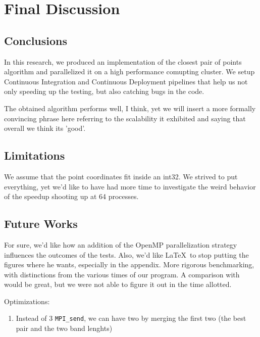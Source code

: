 \section{Final Discussion}
\label{sec:final_discussion}

\subsection{Conclusions}
In this research, we produced an implementation of the closest pair of points algorithm and parallelized it on a high performance comupting cluster.
We setup Continuous Integration and Continuous Deployment pipelines that help us not only speeding up the testing, but also catching bugs in the code.

The obtained algorithm performs well, I think, yet we will insert a more formally convincing phrase here referring to the scalability it exhibited and saying that overall we think its 'good'.

\subsection{Limitations}
We assume that the point coordinates fit inside an int32.
We strived to put everything, yet we'd like to have had more time to investigate the weird behavior of the speedup shooting up at 64 processes.

\subsection{Future Works}
\label{subsec:future_works}
For sure, we'd like how an addition of the OpenMP parallelization strategy influences the outcomes of the tests.
Also, we'd like \LaTeX~to stop putting the figures where he wants, especially in the appendix.
More rigorous benchmarking, with distinctions from the various times of our program.
A comparison with \cite{wang2020parallel} would be great, but we were not able to figure it out in the time allotted.

Optimizations:
\begin{enumerate}
    \item Instead of 3 \verb|MPI_send|, we can have two by merging the first two (the best pair and the two band lenghts)
\end{enumerate}